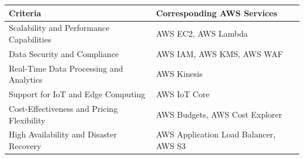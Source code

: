 \documentclass{article}
\begin{document}
\begin{table}[H]
    \centering
    \def\arraystretch{1.75}
    \begin{tabular}{|p{0.5\linewidth}| p{0.5\linewidth}|} \hline 
         \textbf{Criteria}& \textbf{Corresponding AWS Services}\\ \hline 
         Scalability and Performance Capabilities& AWS EC2, AWS Lambda\\ \hline 
         Data Security and Compliance& AWS IAM, AWS KMS, AWS WAF\\ \hline 
         Real-Time Data Processing and Analytics& AWS Kinesis\\ \hline 
         Support for IoT and Edge Computing& AWS IoT Core\\ \hline 
         Cost-Effectiveness and Pricing Flexibility& AWS Budgets, AWS Cost Explorer\\ \hline 
         High Availability and Disaster Recovery& AWS Application Load Balancer, AWS S3\\ \hline
    \end{tabular}
    
    
\end{table}
\end{document}

